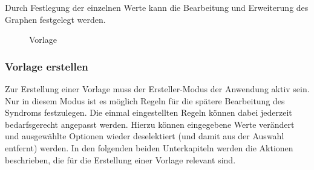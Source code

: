 \documentclass[enabledeprecatedfontcommands,fontsize=11pt,paper=a4,twoside]{scrartcl}
\newcounter{one}
\begin{document}
Durch Festlegung der einzelnen Werte kann die Bearbeitung und Erweiterung des Graphen festgelegt werden.

	\begin{figure}[ht!]
		\centering
		\caption{Vorlage}
		
	\end{figure}


\subsubsection{Vorlage erstellen}
Zur Erstellung einer Vorlage muss der Ersteller-Modus der Anwendung aktiv sein. Nur in diesem Modus ist es möglich Regeln für die spätere Bearbeitung des Syndroms festzulegen. Die einmal eingestellten Regeln können dabei jederzeit bedarfsgerecht angepasst werden. Hierzu können eingegebene Werte verändert und ausgewählte Optionen wieder deselektiert (und damit aus der Auswahl entfernt) werden. In den folgenden beiden Unterkapiteln werden die Aktionen beschrieben, die für die Erstellung einer Vorlage relevant sind. \\
\newpage
\end{document}
